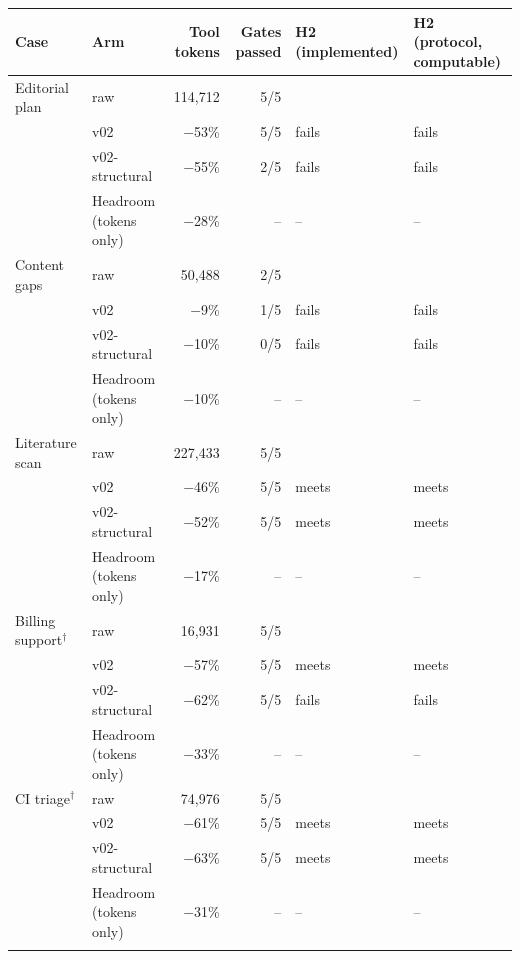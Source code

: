 \begin{tabular}{llrrll}
\toprule
Case & Arm & Tool tokens & Gates passed & H2 (implemented) & H2 (protocol, computable) \\
\midrule
Editorial plan & raw & 114{,}712 & 5/5 &  &  \\
 & v02 & $-$53\% & 5/5 & fails & fails \\
 & v02-structural & $-$55\% & 2/5 & fails & fails \\
 & Headroom (tokens only) & $-$28\% & -- & -- & -- \\
\addlinespace
Content gaps & raw & 50{,}488 & 2/5 &  &  \\
 & v02 & $-$9\% & 1/5 & fails & fails \\
 & v02-structural & $-$10\% & 0/5 & fails & fails \\
 & Headroom (tokens only) & $-$10\% & -- & -- & -- \\
\addlinespace
Literature scan & raw & 227{,}433 & 5/5 &  &  \\
 & v02 & $-$46\% & 5/5 & meets & meets \\
 & v02-structural & $-$52\% & 5/5 & meets & meets \\
 & Headroom (tokens only) & $-$17\% & -- & -- & -- \\
\addlinespace
Billing support$^\dagger$ & raw & 16{,}931 & 5/5 &  &  \\
 & v02 & $-$57\% & 5/5 & meets & meets \\
 & v02-structural & $-$62\% & 5/5 & fails & fails \\
 & Headroom (tokens only) & $-$33\% & -- & -- & -- \\
\addlinespace
CI triage$^\dagger$ & raw & 74{,}976 & 5/5 &  &  \\
 & v02 & $-$61\% & 5/5 & meets & meets \\
 & v02-structural & $-$63\% & 5/5 & meets & meets \\
 & Headroom (tokens only) & $-$31\% & -- & -- & -- \\
\addlinespace
\bottomrule
\end{tabular}
